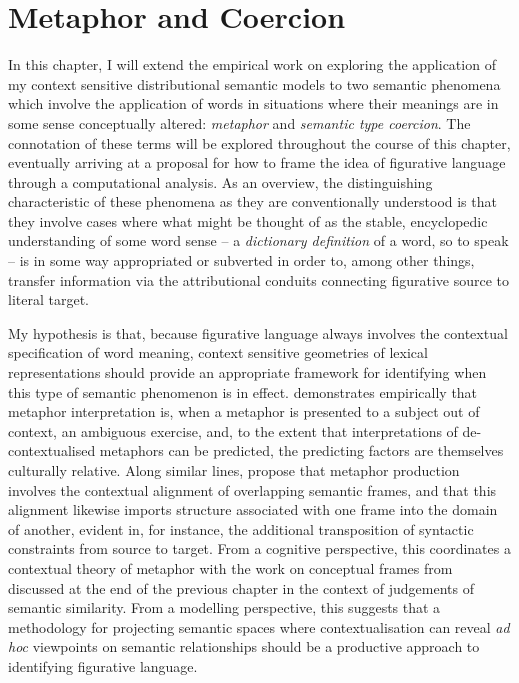 \chapter{Metaphor and Coercion} \label{chap:figurative}
In this chapter, I will extend the empirical work on exploring the application of my context sensitive distributional semantic models to two semantic phenomena which involve the application of words in situations where their meanings are in some sense conceptually altered: \emph{metaphor} and \emph{semantic type coercion}.  The connotation of these terms will be explored throughout the course of this chapter, eventually arriving at a proposal for how to frame the idea of figurative language through a computational analysis.  As an overview, the distinguishing characteristic of these phenomena as they are conventionally understood is that they involve cases where what might be thought of as the stable, encyclopedic understanding of some word sense -- a \emph{dictionary definition} of a word, so to speak -- is in some way appropriated or subverted in order to, among other things, transfer information via the attributional conduits connecting figurative source to literal target.

My hypothesis is that, because figurative language always involves the contextual specification of word meaning, context sensitive geometries of lexical representations should provide an appropriate framework for identifying when this type of semantic phenomenon is in effect.  \cite{Fraser1993} demonstrates empirically that metaphor interpretation is, when a metaphor is presented to a subject out of context, an ambiguous exercise, and, to the extent that interpretations of de-contextualised metaphors can be predicted, the predicting factors are themselves culturally relative.  Along similar lines, \cite{BouveretEA2009} propose that metaphor production involves the contextual alignment of overlapping semantic frames, and that this alignment likewise imports structure associated with one frame into the domain of another, evident in, for instance, the additional transposition of syntactic constraints from source to target.  From a cognitive perspective, this coordinates a contextual theory of metaphor with the work on conceptual frames from \cite{Barsalou1992} discussed at the end of the previous chapter in the context of judgements of semantic similarity.  From a modelling perspective, this suggests that a methodology for projecting semantic spaces where contextualisation can reveal \emph{ad hoc} viewpoints on semantic relationships should be a productive approach to identifying figurative language.

